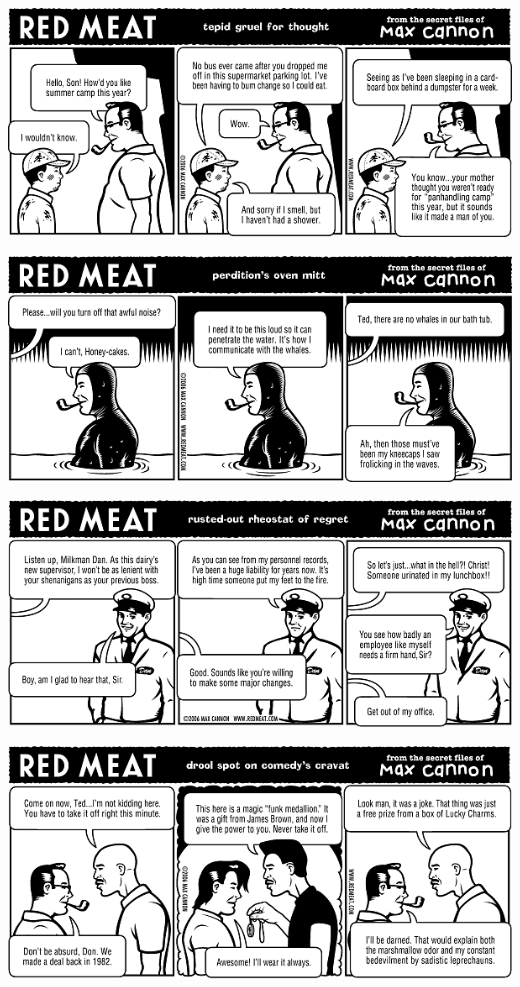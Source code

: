 \documentclass[a4paper,twoside,11pt]{article}
\begin{document}
\includegraphics[width=\textwidth]{redmeat_2006-08-01.png}



\includegraphics[width=\textwidth]{redmeat_2006-08-08.png}



\includegraphics[width=\textwidth]{redmeat_2006-08-15.png}



\includegraphics[width=\textwidth]{redmeat_2006-08-22.png}
\end{document}
